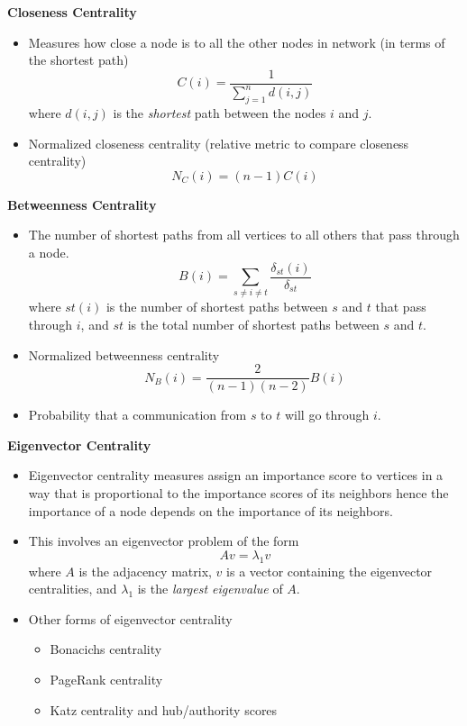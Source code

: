 \textbf{Closeness Centrality}
\begin{itemize}
    \item Measures how close a node is to all the other nodes in network (in terms of the shortest path)
    \begin{equation*}
        \boxed{C(i)=\frac{1}{\sum _{j=1}^{n} d(i,j)}}
    \end{equation*}
    where $d(i,j)$ is the \textit{shortest} path between the nodes $i$ and $j$.
    \item Normalized closeness centrality (relative metric to compare closeness centrality)
    \begin{equation*}
        \boxed{N_{C} (i)=(n-1)C(i)}
    \end{equation*}
\end{itemize}

\textbf{Betweenness Centrality}
\begin{itemize}
    \item The number of shortest paths from all vertices to all others that pass through a node.
    \begin{equation*}
        \boxed{B(i)=\sum _{s\neq i\neq t}\frac{\delta _{st} (i)}{\delta _{st}}}
    \end{equation*}
    where $st\left(i\right)$ is the number of shortest paths between $s$ and $t$ that pass through $i$, and $st$ is the total number of shortest paths between $s$ and $t$.
    \item Normalized betweenness centrality
    \begin{equation*}
        N_{B} (i)=\frac{2}{(n-1)(n-2)} B(i)
    \end{equation*}
    \item Probability that a communication from $s$ to $t$ will go through $i$.
\end{itemize}

\textbf{Eigenvector Centrality}
\begin{itemize}
    \item Eigenvector centrality measures assign an importance score to vertices in a way that is proportional to the importance scores of its neighbors hence the importance of a node depends on the importance of its neighbors.
    \item This involves an eigenvector problem of the form
    \begin{equation*}
        Av=\lambda _{1} v
    \end{equation*}
    where $A$ is the adjacency matrix, $v$ is a vector containing the eigenvector centralities, and $\lambda _{1}$ is the \textit{largest eigenvalue} of $A$.
    \item Other forms of eigenvector centrality
    \begin{itemize}
        \item Bonacichs centrality
        \item PageRank centrality
        \item Katz centrality and hub/authority scores
    \end{itemize}
\end{itemize}

